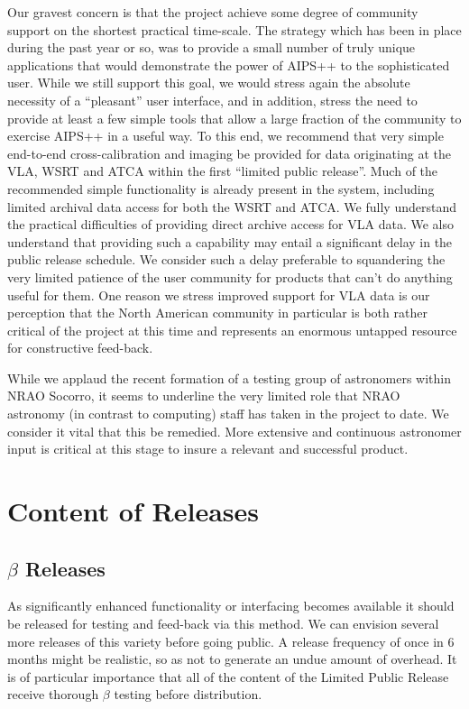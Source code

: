 Our gravest concern is that the project achieve some degree of
community support on the shortest practical time-scale. The strategy
which has been in place during the past year or so, was to provide a
small number of truly unique applications that would demonstrate the
power of AIPS++ to the sophisticated user. While we still support this
goal, we would stress again the absolute necessity of a ``pleasant''
user interface, and in addition, stress the need to provide at least a
few simple tools that allow a large fraction of the community to
exercise AIPS++ in a useful way. To this end, we recommend that very
simple end-to-end cross-calibration and imaging be provided for data
originating at the VLA, WSRT and ATCA within the first ``limited
public release''.  Much of the recommended simple functionality is
already present in the system, including limited archival data access
for both the WSRT and ATCA. We fully understand the practical
difficulties of providing direct archive access for VLA data.
We also understand that providing such a capability may
entail a significant delay in the public release schedule. We consider
such a delay preferable to squandering the very limited patience of
the user community for products that can't do anything useful for
them. One reason we stress improved support for VLA data is our
perception that the North American community in particular is both
rather critical of the project at this time and represents an
enormous untapped resource for constructive feed-back.  

While we applaud the recent formation of a testing group of
astronomers within NRAO Socorro, it seems to underline the very
limited role that NRAO astronomy (in contrast to computing) staff has
taken in the project to date. We consider it vital that this be
remedied. More extensive and continuous astronomer input is critical
at this stage to insure a relevant and successful product.

\section{Content of Releases}

\subsection{$\beta$ Releases}

As significantly enhanced functionality or interfacing becomes
available it should be released for testing and feed-back via this
method. We can envision several more releases of this variety before
going public. A release frequency of once in 6 months might be
realistic, so as not to generate an undue amount of overhead. It is of
particular importance that all of the content of the Limited Public
Release receive thorough $\beta$ testing before distribution. 

